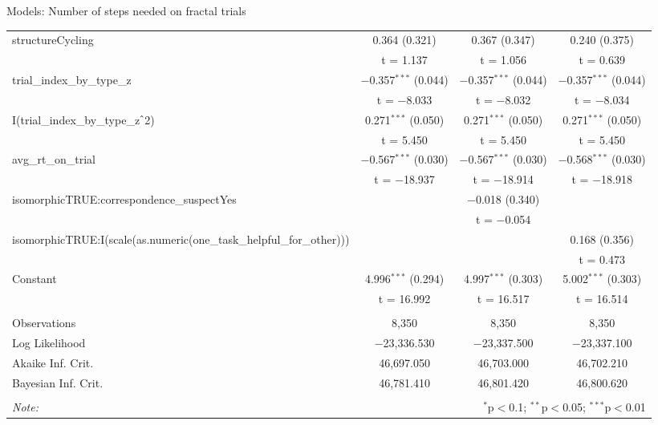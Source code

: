 \documentclass{beamer}
\begin{document}
\begin{frame}{Models: Number of steps needed on fractal trials}
\begin{center}
{\begin{tabular}{@{\extracolsep{5pt}}lccc}
  structureCycling & 0.364 (0.321) & 0.367 (0.347) & 0.240 (0.375) \\ 
  & t = 1.137 & t = 1.056 & t = 0.639 \\ 
  trial\_index\_by\_type\_z & $-$0.357$^{***}$ (0.044) & $-$0.357$^{***}$ (0.044) & $-$0.357$^{***}$ (0.044) \\ 
  & t = $-$8.033 & t = $-$8.032 & t = $-$8.034 \\ 
  I(trial\_index\_by\_type\_z$\hat{\mkern6mu}$2) & 0.271$^{***}$ (0.050) & 0.271$^{***}$ (0.050) & 0.271$^{***}$ (0.050) \\ 
  & t = 5.450 & t = 5.450 & t = 5.450 \\ 
  avg\_rt\_on\_trial & $-$0.567$^{***}$ (0.030) & $-$0.567$^{***}$ (0.030) & $-$0.568$^{***}$ (0.030) \\ 
  & t = $-$18.937 & t = $-$18.914 & t = $-$18.918 \\ 
  isomorphicTRUE:correspondence\_suspectYes &  & $-$0.018 (0.340) &  \\ 
  &  & t = $-$0.054 &  \\ 
  isomorphicTRUE:I(scale(as.numeric(one\_task\_helpful\_for\_other))) &  &  & 0.168 (0.356) \\ 
  &  &  & t = 0.473 \\ 
  Constant & 4.996$^{***}$ (0.294) & 4.997$^{***}$ (0.303) & 5.002$^{***}$ (0.303) \\ 
  & t = 16.992 & t = 16.517 & t = 16.514 \\ 
 \hline \\[-1.8ex] 
Observations & 8,350 & 8,350 & 8,350 \\ 
Log Likelihood & $-$23,336.530 & $-$23,337.500 & $-$23,337.100 \\ 
Akaike Inf. Crit. & 46,697.050 & 46,703.000 & 46,702.210 \\ 
Bayesian Inf. Crit. & 46,781.410 & 46,801.420 & 46,800.620 \\ 
\hline 
\hline \\[-1.8ex] 
\textit{Note:}  & \multicolumn{3}{r}{$^{*}$p$<$0.1; $^{**}$p$<$0.05; $^{***}$p$<$0.01} \\ 
\end{tabular} 
} 
\end{center}

\end{frame}
\end{document}
